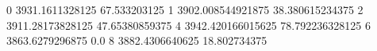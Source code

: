 0 3931.1611328125 67.533203125
1 3902.008544921875 38.380615234375
2 3911.28173828125 47.65380859375
4 3942.420166015625 78.792236328125
6 3863.6279296875 0.0
8 3882.4306640625 18.802734375
